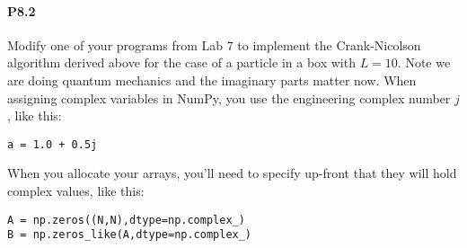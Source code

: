 \paragraph*{P8.2}
Modify one of your programs from Lab 7 to implement the Crank-Nicolson algorithm derived above for the case of a particle in a box with $L = 10$. Note we are doing quantum mechanics and the imaginary parts matter now. When assigning complex variables in NumPy, you use the engineering complex number $j$, like this:
\begin{lstlisting}
a = 1.0 + 0.5j
\end{lstlisting}
When you allocate your arrays, you\rq ll need to specify up-front that they will
hold complex values, like this:
\begin{lstlisting}
A = np.zeros((N,N),dtype=np.complex_)
B = np.zeros_like(A,dtype=np.complex_)
\end{lstlisting}
